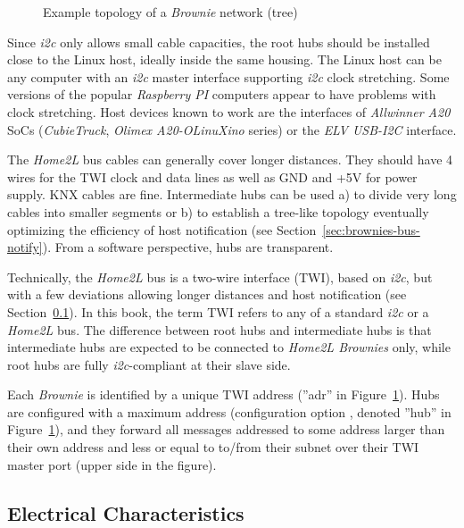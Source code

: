 \documentclass[12pt,english,parskip=half,headheight=19pt]{scrreprt}
\newcommand{\figsvg}[2][]{}            %
\newcommand{\figsvg}[2][]{\href{#2}{}} %
\newcommand{\lst}[1]{\colorbox{lstbackground}{\footnotesize\code{#1}}}
\begin{document}
\begin{figure}[ht]
  \centering
  \figsvg[width=\linewidth]{figs/brownies-topology.svg}
  \caption[l]{Example topology of a \textit{Brownie} network (tree)}
  \label{fig:brownies-topology}
\end{figure}

Since \textit{i2c} only allows small cable capacities, the root hubs should be installed close to the Linux host, ideally inside the same housing. The Linux host can be any computer with an \textit{i2c} master interface supporting \textit{i2c} clock stretching. Some versions of the popular \textit{Raspberry PI} computers appear to have problems with clock stretching. Host devices known to work are the interfaces of \textit{Allwinner A20} SoCs (\textit{CubieTruck}, \textit{Olimex A20-OLinuXino} series) or the \textit{ELV USB-I2C} interface.

The \textit{Home2L} bus cables can generally cover longer distances. They should have 4 wires for the TWI clock and data lines as well as GND and +5V for power supply. KNX cables are fine. Intermediate hubs can be used a) to divide very long cables into smaller segments or b) to establish a tree-like topology eventually optimizing the efficiency of host notification (see Section~\ref{sec:brownies-bus-notify}). From a software perspective, hubs are transparent.

Technically, the \textit{Home2L} bus is a two-wire interface (TWI), based on \textit{i2c}, but with a few deviations allowing longer distances and host notification (see Section~\ref{sec:brownies-bus-electrical}). In this book, the term TWI refers to any of a standard \textit{i2c} or a \textit{Home2L} bus. The difference between root hubs and intermediate hubs is that intermediate hubs are expected to be connected to \textit{Home2L Brownies} only, while root hubs are fully \textit{i2c}-compliant at their slave side.

Each \textit{Brownie} is identified by a unique TWI address (''adr'' in Figure~\ref{fig:brownies-topology}). Hubs are configured with a maximum address (configuration option \lst{hub_maxadr}, denoted ''hub'' in Figure~\ref{fig:brownies-topology}), and they forward all messages addressed to some address larger than their own address and less or equal to \lst{hub_maxadr} to/from their subnet over their TWI master port (upper side in the figure).



\subsection{Electrical Characteristics}
\label{sec:brownies-bus-electrical}
\end{document}
